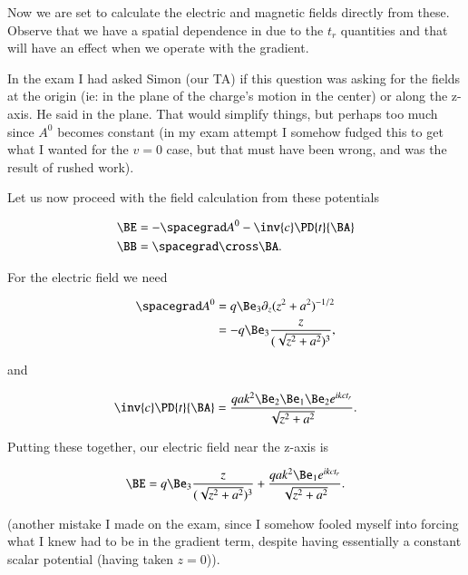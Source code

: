 {Now we are set to calculate the electric and magnetic fields directly from these.  Observe that we have a spatial dependence in due to the \(t_r\) quantities and that will have an effect when we operate with the gradient.

In the exam I had asked Simon (our TA) if this question was asking for the fields at the origin (ie: in the plane of the charge's motion in the center) or along the z-axis.  He said in the plane.  That would simplify things, but perhaps too much since \(A^0\) becomes constant (in my exam attempt I somehow fudged this to get what I wanted for the \(v = 0\) case, but that must have been wrong, and was the result of rushed work).

Let us now proceed with the field calculation from these potentials

\begin{equation}\label{eqn:relativisticElectrodynamicsExamReflection:190}
\begin{aligned}
\BE &= - \spacegrad A^0 - \inv{c} \PD{t}{\BA} \\
\BB &= \spacegrad \cross \BA.
\end{aligned}
\end{equation}

For the electric field we need

\begin{equation}\label{eqn:relativisticElectrodynamicsExamReflection:1170}
\begin{aligned}
\spacegrad A^0
&= q \Be_3 \partial_z (z^2 + a^2)^{-1/2} \\
&= -q \Be_3 \frac{z}{(\sqrt{z^2 + a^2})^3},
\end{aligned}
\end{equation}

and

\begin{equation}\label{eqn:relativisticElectrodynamicsExamReflection:210}
\inv{c} \PD{t}{\BA} =
\frac{q a k^2 \Be_2 \Be_1 \Be_2 e^{i k c t_r} }{\sqrt{z^2 + a^2}}.
\end{equation}

Putting these together, our electric field near the z-axis is

\begin{equation}\label{eqn:relativisticElectrodynamicsExamReflection:230}
\BE =
q \Be_3 \frac{z}{(\sqrt{z^2 + a^2})^3}
+
\frac{q a k^2 \Be_1 e^{i k c t_r} }{\sqrt{z^2 + a^2}}.
\end{equation}

(another mistake I made on the exam, since I somehow fooled myself into forcing what I knew had to be in the gradient term, despite having essentially a constant scalar potential (having taken \(z = 0\))).

}
